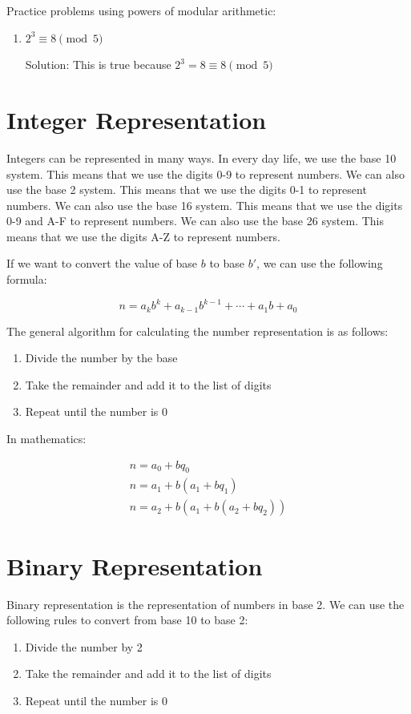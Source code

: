 \documentclass[11pt]{article}
\begin{document}
Practice problems using powers of modular arithmetic:

\begin{enumerate}
\item \(2^3 \equiv 8 \pmod{5}\)

Solution: This is true because \(2^3 = 8 \equiv 8 \pmod{5}\)
\end{enumerate}



\section{Integer Representation}
\label{sec:org2b04a3f}
Integers can be represented in many ways. In every day life, we use the base 10 system. This means that we use the digits 0-9 to represent numbers. We can also use the base 2 system. This means that we use the digits 0-1 to represent numbers. We can also use the base 16 system. This means that we use the digits 0-9 and A-F to represent numbers. We can also use the base 26 system. This means that we use the digits A-Z to represent numbers.

If we want to convert the value of base \(b\) to base \(b'\), we can use the following formula:

\[
n = a_k b^k + a_{k-1} b^{k-1} + \cdots + a_1 b + a_0
\]

The general algorithm for calculating the number representation is as follows:
\begin{enumerate}
\item Divide the number by the base
\item Take the remainder and add it to the list of digits
\item Repeat until the number is 0
\end{enumerate}

In mathematics:

\begin{align}
n = a_0 + bq_0 \\
n = a_1 + b(a_1 + bq_1) \\
n = a_2 + b(a_1 + b(a_2 + bq_2))
\end{align}

\section{Binary Representation}
\label{sec:org9740234}
Binary representation is the representation of numbers in base 2. We can use the following rules to convert from base 10 to base 2:
\begin{enumerate}
\item Divide the number by 2
\item Take the remainder and add it to the list of digits
\item Repeat until the number is 0
\end{enumerate}
\end{document}
